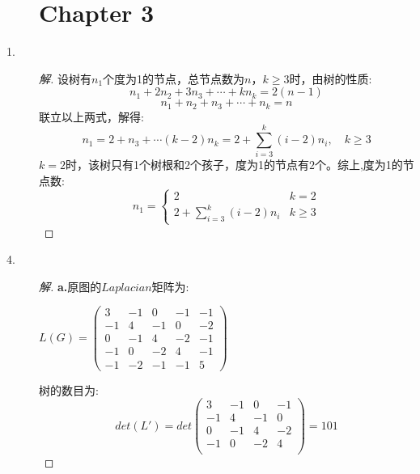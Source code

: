 \documentclass[UTF8, onecolumn, a4paper]{article}
\begin{document}
\begin{description}
\section*{Chapter 3}
\item[1.]
\begin{proof}[解]
设树有$n_1$个度为1的节点，总节点数为$n$，$k\geq3$时，由树的性质:
$$n_1 + 2n_2 + 3n_3 + \cdots + kn_k = 2(n-1)$$
$$n_1+n_2+n_3+\cdots+n_k = n$$
联立以上两式，解得:
$$n_1 = 2 + n_3 + \cdots (k-2)n_k = 2 + \sum_{i=3}^{k}(i-2)n_i,\quad k \geq 3$$
$k=2$时，该树只有1个树根和2个孩子，度为1的节点有$2$个。综上,度为1的节点数:
\begin{equation}
n_1=
\begin{cases}
2&k = 2\\
2 + \sum_{i=3}^{k}(i-2)n_i&k\geq3
\end{cases}
\end{equation}
\end{proof}

\item[4.]
\begin{proof}[解]
\textbf{a.}原图的$Laplacian$矩阵为:
\begin{center}
	$L(G) = \begin{pmatrix}
	3 & -1 & 0 & -1 & -1\\
	-1 & 4 & -1 & 0 & -2\\
	0 & -1 & 4 & -2 & -1 \\
	-1 & 0 & -2 & 4 & -1 \\
	-1 & -2 & -1 & -1 & 5
	\end{pmatrix}$
\end{center}
树的数目为:
$$det(L') = det\left(
\begin{array}{cccc}
3 & -1 & 0 & -1\\
-1 & 4 & -1 & 0\\
0 & -1 & 4 & -2 \\
-1 & 0 & -2 & 4 \\
\end{array}
\right) = 101$$


\end{proof}
\end{description}
\end{document}
